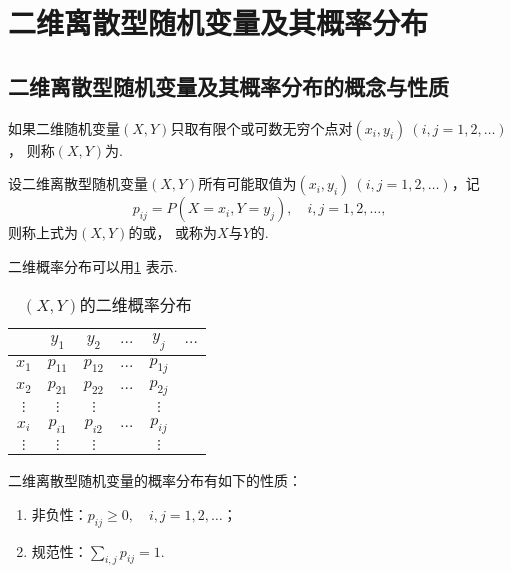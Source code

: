 \section{二维离散型随机变量及其概率分布}

\subsection{二维离散型随机变量及其概率分布的概念与性质}
\begin{definition}
如果二维随机变量\((X,Y)\)只取有限个或可数无穷个点对\((x_i,y_i)\ (i,j=1,2,\dotsc)\)，
则称\((X,Y)\)为.
\end{definition}

\begin{definition}
设二维离散型随机变量\((X,Y)\)所有可能取值为\((x_i,y_i)\ (i,j=1,2,\dotsc)\)，记\[
p_{ij} = P(X = x_i, Y = y_j), \quad i,j = 1,2,\dotsc,
\]则称上式为\((X,Y)\)的或，
或称为\(X\)与\(Y\)的.
\end{definition}

二维概率分布可以用\cref{table:多维随机变量及其分布.二维概率分布} 表示.

\begin{table}[ht]
\centering
\begin{tabular}{c|*5c}
	& \(y_1\) & \(y_2\) & \(\dots\) & \(y_j\) & \(\dots\) \\ \hline
\(x_1\) & \(p_{11}\) & \(p_{12}\) & \(\dots\) & \(p_{1j}\) \\
\(x_2\) & \(p_{21}\) & \(p_{22}\) & \(\dots\) & \(p_{2j}\) \\
\(\vdots\) & \(\vdots\) & \(\vdots\) & & \(\vdots\) \\
\(x_i\) & \(p_{i1}\) & \(p_{i2}\) & \(\dots\) & \(p_{ij}\) \\
\(\vdots\) & \(\vdots\) & \(\vdots\) & & \(\vdots\) \\
\end{tabular}
\caption{\((X,Y)\)的二维概率分布}
\label{table:多维随机变量及其分布.二维概率分布}
\end{table}

\begin{property}
二维离散型随机变量的概率分布有如下的性质：
\begin{enumerate}
\item 非负性：\(p_{ij} \geq 0, \quad i,j=1,2,\dotsc\)；
\item 规范性：\(\sum_{i,j} p_{ij} = 1\).
\end{enumerate}
\end{property}


